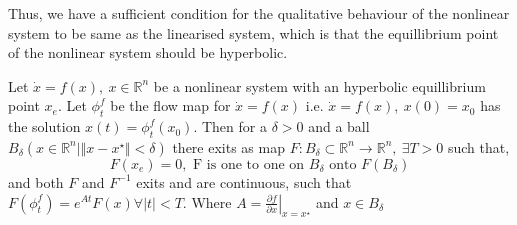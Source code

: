 Thus, we have a sufficient condition for the qualitative behaviour of the nonlinear system to be
same as the linearised system, which is that the equillibrium point of the nonlinear system should
be hyperbolic.

\begin{theorem}
Let \(\dot{x}=f(x),\:x\in\mathbb{R}^n\) be a nonlinear system with an hyperbolic
equillibrium point \(x_e\). Let \(\phi_t^f\) be the flow map for \(\dot{x}=f(x)\) i.e. \(\dot{x}=f(x),\:x(0)=x_0\)
has the solution \(x(t)=\phi_t^f(x_0)\). Then for a \(\delta >0\) and a ball \(B_{\delta}(x\in\mathbb{R}^n \vert
\Vert x-x^{\star}\Vert < \delta)\) there exits as map \(F : B_{\delta} \subset \mathbb{R}^n \to \mathbb{R}^n, \: \exists T > 0\)
such that, 
\[
    F(x_e) = 0, \text{ F is one to one on } B_\delta \text{ onto } F(B_\delta)  
\]        
and both \(F\) and \(F^{-1} \) exits and are continuous, such that \(F(\phi_t^f) = e^{At}F(x) \forall \vert t \vert
< T\). Where \(A = \left . \frac{\partial f}{\partial x} \right |_{x=x^{\star}}\) and \(x\in B_\delta \)\\

\label{thm:hartmanGrobman}
\end{theorem}
\vspace{0.5em}

